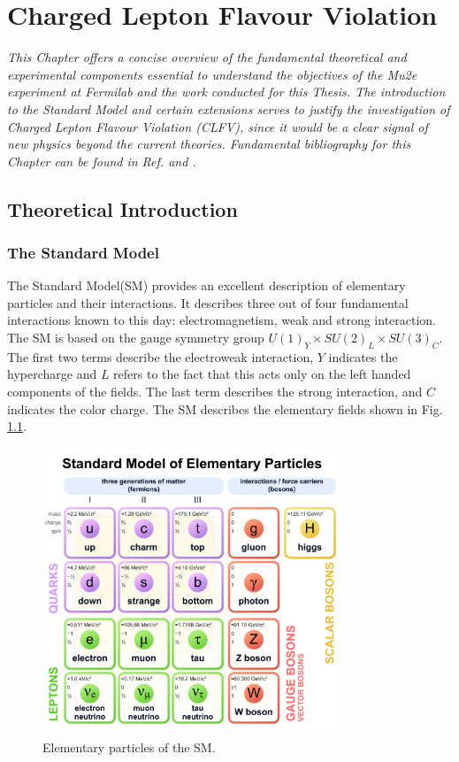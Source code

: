 \chapter{Charged Lepton Flavour Violation}\label{intr}
\textit{This Chapter offers a concise overview of the fundamental 
theoretical and experimental components essential to understand the objectives 
of the Mu2e experiment at Fermilab and the work conducted for this 
Thesis. The introduction to the Standard Model and certain extensions serves to 
justify the investigation of Charged Lepton Flavour Violation (CLFV), 
since it would be a clear signal of new physics beyond the current theories. 
Fundamental bibliography for this Chapter can be found in Ref. \cite{Bernstein_2013} and \cite{clfv_signorelli}.}
\section{Theoretical Introduction}
\subsection{The Standard Model}
The Standard Model(SM) provides an excellent description of elementary particles and their interactions.
It describes three out of 
four fundamental interactions known to this day: electromagnetism, weak and strong interaction.
The SM is 
based on the gauge symmetry group $U(1)_Y \times SU(2)_L \times SU(3)_C$. The 
first two terms describe the electroweak interaction, $Y$ indicates 
the hypercharge and $L$ refers to the fact that this acts only on the left handed components of the fields.
The last term describes the strong interaction, and $C$ indicates the color charge.
The SM describes the elementary fields shown in Fig. \ref{fig:sm}.

\begin{figure}[!h]
\centering
\includegraphics[width =0.8\textwidth]{figures/pdf/Standard_Model_of_Elementary_Particles.pdf}
\caption[Elementary particles of the Standard Model.]{Elementary particles of the SM.}
\label{fig:sm}
\end{figure}


